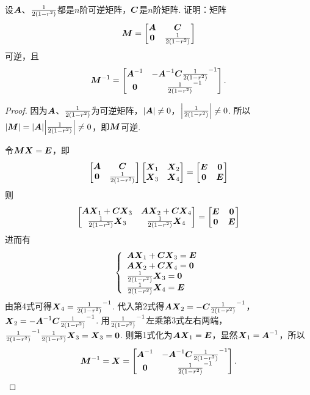 \begin{example}
设\(\A\)、\(\B\)都是\(n\)阶可逆矩阵，\(\C\)是\(n\)阶矩阵.
证明：矩阵\[
\mat{M} = \begin{bmatrix}
\A & \C \\
\z & \B
\end{bmatrix}
\]可逆，且\[
\mat{M}^{-1} = \begin{bmatrix}
\A^{-1} & -\A^{-1} \C \B^{-1} \\
\z & \B^{-1}
\end{bmatrix}.
\]
\begin{proof}
因为\(\A\)、\(\B\)为可逆矩阵，\(\abs{\A} \neq 0\)，\(\abs{\B} \neq 0\).
所以\(\abs{\mat{M}}=\abs{\A}\abs{\B} \neq 0\)，即\(\mat{M}\)可逆.

令\(\mat{M}\mat{X}=\E\)，即\[
\begin{bmatrix}
\A & \C \\
\z & \B
\end{bmatrix}\begin{bmatrix}
\mat{X}_1 & \mat{X}_2 \\
\mat{X}_3 & \mat{X}_4
\end{bmatrix} = \begin{bmatrix}
\E & \z \\
\z & \E
\end{bmatrix}
\]则\[
\begin{bmatrix}
\A\mat{X}_1+\C\mat{X}_3 & \A\mat{X}_2+\C\mat{X}_4 \\
\B\mat{X}_3 & \B\mat{X}_4
\end{bmatrix} = \begin{bmatrix}
\E & \z \\
\z & \E
\end{bmatrix}
\]进而有\[
\left\{ \begin{array}{l}
\A\mat{X}_1+\C\mat{X}_3 = \E \\
\A\mat{X}_2+\C\mat{X}_4 = \z \\
\B\mat{X}_3 = \z \\
\B\mat{X}_4 = \E
\end{array} \right.
\]
由第4式可得\(\mat{X}_4 = \B^{-1}\).
代入第2式得\(\A\mat{X}_2=-\C\B^{-1}\)，%
\(\mat{X}_2=-\A^{-1}\C\B^{-1}\).
用\(\B^{-1}\)左乘第3式左右两端，\(\B^{-1}\B\mat{X}_3=\mat{X}_3=\z\).
则第1式化为\(\A\mat{X}_1=\E\)，显然\(\mat{X}_1=\A^{-1}\)，所以\[
\mat{M}^{-1} = \mat{X} = \begin{bmatrix}
\A^{-1} & -\A^{-1}\C\B^{-1} \\
\z & \B^{-1}
\end{bmatrix}.
\qedhere
\]
\end{proof}
\end{example}

